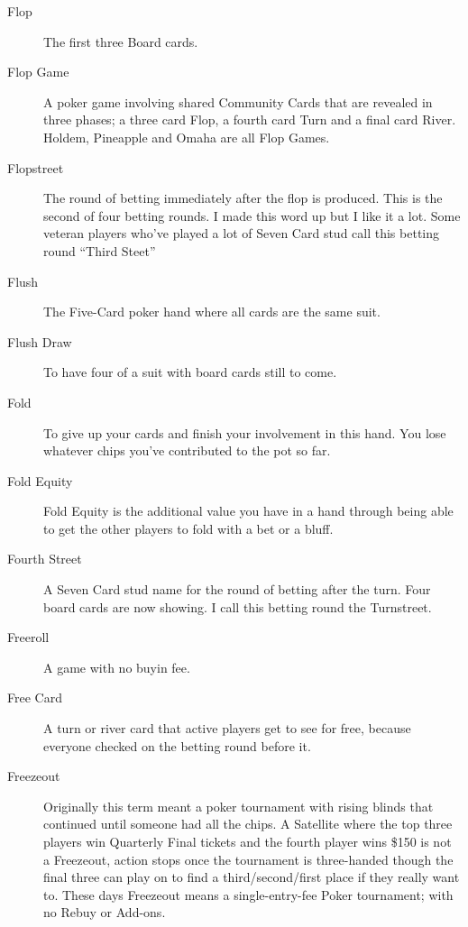 \begin{description}
\item[Flop] The first three Board cards.

\item[Flop Game] A poker game involving shared Community Cards that
are revealed in three phases; a three card Flop, a fourth card Turn
and a final card River. Holdem, Pineapple and Omaha are all Flop
Games.

\item[Flopstreet] The round of betting immediately after the flop is
produced. This is the second of four betting rounds. I made this word
up but I like it a lot. Some veteran players who've played a lot of
Seven Card stud call this betting round ``Third Steet''

\item[Flush] The Five-Card poker hand where all cards are the same
suit.

\item[Flush Draw] To have four of a suit with board cards still to
come.

\item[Fold] To give up your cards and finish your involvement in this
hand. You lose whatever chips you've contributed to the pot so far.

\item[Fold Equity] Fold Equity is the additional value you have in a
hand through being able to get the other players to fold with a bet or
a bluff.

\item[Fourth Street] A Seven Card stud name for the round of betting
after the turn. Four board cards are now showing. I call this betting
round the Turnstreet.

\item[Freeroll] A game with no buyin fee.

\item[Free Card] A turn or river card that active players get to see
for free, because everyone checked on the betting round before it.

\item[Freezeout] Originally this term meant a poker tournament with
rising blinds that continued until someone had all the chips. A
Satellite where the top three players win Quarterly Final tickets and
the fourth player wins \$150 is not a Freezeout, action stops once the
tournament is three-handed though the final three can play on to find
a third/second/first place if they really want to. These days
Freezeout means a single-entry-fee Poker tournament; with no Rebuy or
Add-ons.


\end{description}

